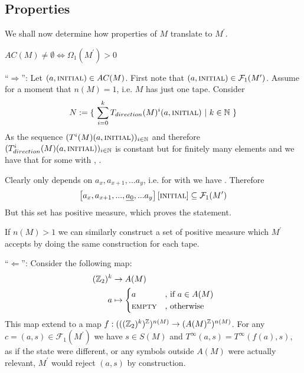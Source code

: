 \subsection{Properties}

We shall now determine how properties of $M$ translate to $M^\prime$.

\begin{Lemma}
	\label{tm_to_tds:properties:lemma_fundamental_value}
	$AC(M) \neq \emptyset \Leftrightarrow \Omega_1(M^\prime) > 0$
\end{Lemma}
\proof
	``$\Rightarrow$'':
	Let $(a,\text{\scshape{initial}}) \in AC(M)$.
	First note that $(a,\text{\scshape{initial}}) \in \mathcal{F}_1(M^\prime)$.
	Assume for a moment that $n(M) = 1$, i.e. $M$ has just one tape. Consider
	\begin{align*}
		N := \{~ \sum_{i=0}^k T_{direction}(M)^i(a,\text{\scshape{initial}})~|~k \in \mathbb{N} ~\}
	\end{align*}
	As the sequence $(T^i(M)(a,\text{\scshape{initial}}))_{i \in \mathbb{N}}$ and therefore $(T_{direction}^i(M)(a,\text{\scshape{initial}}))_{i \in \mathbb{N}}$ is constant but for finitely many elements
	and 
	we have that  for some  with , .
	
	Clearly  only depends on $a_x, a_{x+1},...a_y$, i.e. for  with  we have . Therefore
	\begin{align*}
		\left [ a_x, a_{x+1},...,\underline{a_0},...a_y \right ] \left [\text{\scshape{initial}} \right ] \subseteq \mathcal{F}_1(M^\prime)
	\end{align*}
	But this set has positive measure, which proves the statement.

	If $n(M) > 1$ we can similarly construct a set of positive measure which $M^\prime$ accepts by doing the same construction for each tape.

	``$\Leftarrow$'':
		Consider the following map:
		\begin{align*}
			(\mathbb{Z}_2)^k &\to A(M) \\
			a &\mapsto
			\begin{cases}
				a &\text{, if}~ a \in A(M) \\
				\text{\scshape{empty}} &\text{, otherwise}
			\end{cases}
		\end{align*}
		This map extend to a map $f: (((\mathbb{Z}_2)^k)^{\mathbb{Z}})^{n(M)} \to (A(M)^{\mathbb{Z}})^{n(M)}$.
		For any $c = (a,s) \in \mathcal{F}_1(M^\prime)$ we have $s \in S(M)$ and $T^\infty(a,s) = T^\infty(f(a),s)$, as if the state were different, or any symbols outside $A(M)$ were actually relevant, $M^\prime$ would reject $(a,s)$ by construction.

